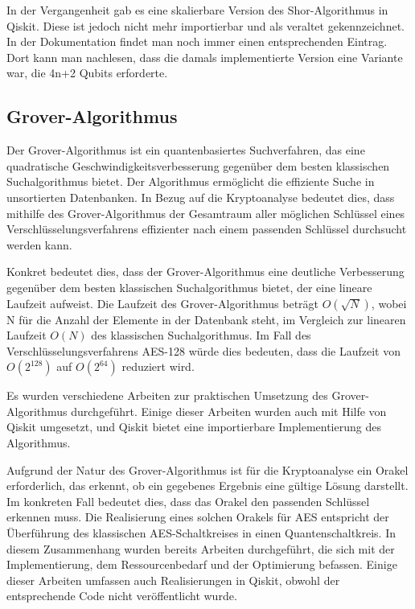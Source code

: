 \documentclass[
  a4paper, %
  10pt, %
  unnumberedsections, %
  twoside, %
]{LTJournalArticle}
\begin{document}
In der Vergangenheit gab es eine skalierbare Version des Shor-Algorithmus in Qiskit.
Diese ist jedoch nicht mehr importierbar und als veraltet gekennzeichnet.
In der Dokumentation findet man noch immer einen entsprechenden Eintrag.
Dort kann man nachlesen, dass die damals implementierte Version eine Variante war,
die 4n+2 Qubits erforderte\autocite{IBM:Shor_docu}.

\subsection{Grover-Algorithmus}
Der Grover-Algorithmus ist ein quantenbasiertes Suchverfahren,
das eine quadratische Geschwindigkeitsverbesserung
gegenüber dem besten klassischen Suchalgorithmus bietet\autocite{grover1996fast}.
Der Algorithmus ermöglicht die effiziente Suche in unsortierten Datenbanken.
In Bezug auf die Kryptoanalyse bedeutet dies,
dass mithilfe des Grover-Algorithmus der Gesamtraum aller möglichen Schlüssel
eines Verschlüsselungsverfahrens effizienter nach einem passenden Schlüssel durchsucht werden kann.

Konkret bedeutet dies,
dass der Grover-Algorithmus eine deutliche Verbesserung gegenüber dem besten klassischen Suchalgorithmus bietet,
der eine lineare Laufzeit aufweist.
Die Laufzeit des Grover-Algorithmus beträgt $O(\sqrt N)$,
wobei N für die Anzahl der Elemente in der Datenbank steht,
im Vergleich zur linearen Laufzeit $O(N)$ des klassischen Suchalgorithmus.
Im Fall des Verschlüsselungsverfahrens AES-128 würde dies bedeuten,
dass die Laufzeit von $O(2^{128})$ auf $O(2^{64})$ reduziert wird.

Es wurden verschiedene Arbeiten zur praktischen Umsetzung des Grover-Algorithmus durchgeführt.
Einige dieser Arbeiten wurden auch mit Hilfe von Qiskit umgesetzt,
und Qiskit bietet eine importierbare Implementierung des Algorithmus\autocite{IBM:Grover}.

Aufgrund der Natur des Grover-Algorithmus ist für die Kryptoanalyse ein Orakel erforderlich,
das erkennt, ob ein gegebenes Ergebnis eine gültige Lösung darstellt.
Im konkreten Fall bedeutet dies, dass das Orakel den passenden Schlüssel erkennen muss.
Die Realisierung eines solchen Orakels für AES
entspricht der Überführung des klassischen AES-Schaltkreises in einen Quantenschaltkreis.
In diesem Zusammenhang wurden bereits Arbeiten durchgeführt,
die sich mit der Implementierung\autocite{jaques2019implementing},
dem Ressourcenbedarf \autocite{grassl2015applying} und der Optimierung\autocite{Li2022} befassen.
Einige dieser Arbeiten umfassen auch Realisierungen in Qiskit,
obwohl der entsprechende Code nicht veröffentlicht wurde\autocite{app11199085}.
\end{document}
